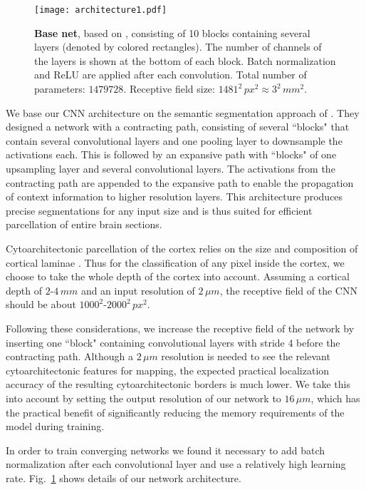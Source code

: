 \documentclass{article}
\begin{document}
\begin{figure}[t]
	\texttt{[image: architecture1.pdf]}
	\caption{
		\textbf{Base net}, based on \cite{ronneberger2015}, consisting of 10 blocks containing several layers (denoted by colored rectangles).
		The number of channels of the layers is shown at the bottom of each block.
		Batch normalization and ReLU are applied after each convolution.
		Total number of parameters: $1479728$. Receptive field size: $1481^2\,px^2 \approx 3^2\,mm^2$.
	}
	\label{fig:arch}
\end{figure}
We base our CNN architecture on the semantic segmentation approach of \cite{ronneberger2015}.
They designed a network with a contracting path, consisting of several ``blocks" that contain several convolutional layers and one pooling layer to downsample the activations each.
This is followed by an expansive path with ``blocks" of one upsampling layer and several convolutional layers.
The activations from the contracting path are appended to the expansive path to enable the propagation of context information to higher resolution layers.
This architecture produces precise segmentations for any input size and is thus suited for efficient parcellation of entire brain sections. %

Cytoarchitectonic parcellation of the cortex relies on the size and composition of cortical laminae \cite{schleicher1999}.
Thus for the classification of any pixel inside the cortex, we choose to take the whole depth of the cortex into account.
Assuming a cortical depth of $2$-$4\,mm$ and an input resolution of $2\,\mu m$, the receptive field of the CNN should be about $1000^2$-$2000^2\,px^2$. %

Following these considerations, we increase the receptive field of the network by inserting one ``block" containing convolutional layers with stride 4 before the contracting path.
Although a $2\,\mu m$ resolution is needed to see the relevant cytoarchitectonic features for mapping, the expected practical localization accuracy of the resulting cytoarchitectonic borders is much lower.
We take this into account by setting the output resolution of our network to $16\,\mu m$, which has the practical benefit of significantly reducing the memory requirements of the model during training.

In order to train converging networks we found it necessary to add batch normalization after each convolutional layer and use a relatively high learning rate.
Fig.~\ref{fig:arch} shows details of our network architecture.
\end{document}

